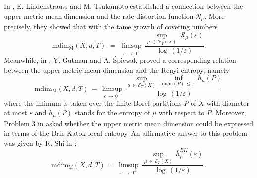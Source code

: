 \documentclass[11pt,a4paper,reqno]{amsart}
\theoremstyle{plain}
\theoremstyle{definition}
\begin{document}
In \cite{LT18}, E. Lindenstrauss and M. Tsukamoto established a connection between the upper metric mean dimension and the rate distortion function $\mathcal{R}_{\mu}$.
More precisely, they showed that with the tame growth of covering numbers
\begin{equation*}\label{eq:vp0}
\mathrm{\overline{mdim}_M}(X,d,T) \, \,=\,\, \limsup_{\varepsilon \, \to \, 0^+}\, \frac{\sup_{\mu \,\in\, \mathcal{P}_T(X)} \, {\mathcal{R}}_{\mu}(\varepsilon)}{\log\,(1/\varepsilon)}.
\end{equation*}
Meanwhile, in \cite{GS}, Y. Gutman and A. \'Spiewak proved a corresponding relation between the upper metric mean dimension and the Rényi entropy, namely
\begin{equation*}\label{eq:vp2}
\mathrm{\overline{mdim}_M}(X,d,T) \, = \, \limsup_{\varepsilon \, \to \, 0^+}\,\frac{\sup_{\mu \,\in\, \mathcal{E}_T(X)} \,\, \inf_{\mathrm{diam}(P)\, \leq \, \varepsilon}\, h_\mu(P)}{\log\,(1/\varepsilon)}\,
\end{equation*}
where the infimum is taken over the finite Borel partitions $P$ of $X$ with diameter at most $\varepsilon$ and $h_\mu(P)$ stands for the 
entropy of $\mu$ with respect to $P$. Moreover, Problem $3$ in \cite{GS} asked whether the upper metric mean dimension could be expressed in terms of the Brin-Katok local entropy. An affirmative answer to this problem was given by R. Shi in \cite{SHI}:
\begin{equation*}\label{eq:vp3}
\mathrm{\overline{mdim}_M}(X,d,T) \, =\, \limsup_{\varepsilon \, \to \, 0^+}\,\frac{\sup_{\mu \,\in\, \mathcal{E}_T(X)} \,\overline{h}^{BK}_\mu(\varepsilon)}{\log\,(1/\varepsilon)}\,.
\end{equation*}
\smallskip
\end{document}
